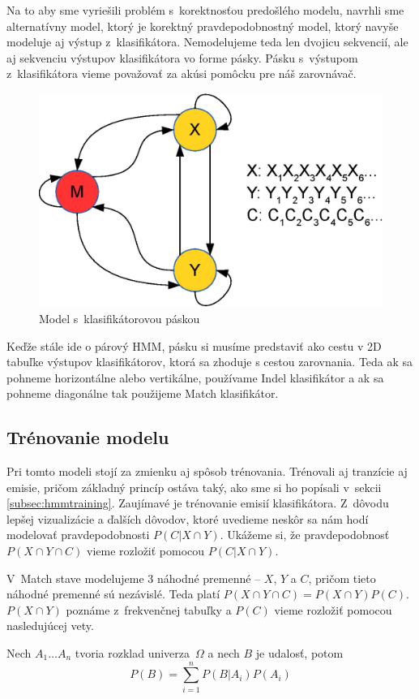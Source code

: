Na to aby sme vyriešili problém s~korektnosťou predošlého modelu, navrhli sme alternatívny model, ktorý je korektný pravdepodobnostný model, ktorý navyše modeluje aj výstup z~klasifikátora.
Nemodelujeme teda len dvojicu sekvencií, ale aj sekvenciu výstupov klasifikátora vo forme pásky.
Pásku s~výstupom z~klasifikátora vieme považovať za akúsi pomôcku pre náš zarovnávač.

\begin{figure}[htp]
    \centering
    \includegraphics[width=.5\textwidth]{images/model_clf_paska}
    \caption{Model s~klasifikátorovou páskou}
\end{figure}

Keďže stále ide o párový HMM, pásku si musíme predstaviť ako cestu v 2D tabuľke výstupov klasifikátorov, ktorá sa zhoduje s cestou zarovnania. Teda ak sa pohneme horizontálne  alebo vertikálne, používame Indel klasifikátor a ak sa pohneme diagonálne tak použijeme Match klasifikátor.

\subsection{Trénovanie modelu} %
Pri tomto modeli stojí za zmienku aj spôsob trénovania.
Trénovali aj tranzície aj emisie, pričom základný princíp ostáva taký, ako sme si ho popísali v~sekcii \ref{subsec:hmmtraining}.
Zaujímavé je trénovanie emisií klasifikátora. Z~dôvodu lepšej vizualizácie a ďalších dôvodov, ktoré uvedieme neskôr sa nám hodí modelovať pravdepodobnosti $P(C|X \cap Y)$. Ukážeme si, že pravdepodobnosť $P(X \cap Y \cap C)$ vieme rozložiť pomocou $P(C|X \cap Y)$.

V~Match stave modelujeme 3 náhodné premenné -- $X$, $Y$ a $C$, pričom tieto náhodné premenné sú nezávislé. Teda platí $P(X \cap Y \cap C) = P(X \cap Y)P(C)$.
$P(X \cap Y)$ poznáme z~frekvenčnej tabuľky a $P(C)$ vieme rozložiť pomocou nasledujúcej vety.

\begin{vt}
Nech $A_1\dots A_n$ tvoria rozklad univerza~$\Omega$ a nech $B$ je udalosť, potom
$$P(B) = \sum_{i=1}^n P(B|A_i)P(A_i)$$
\end{vt}

